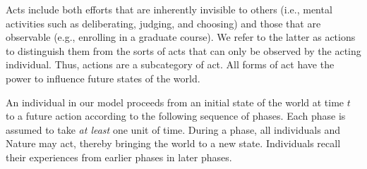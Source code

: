 \documentclass[
11pt,
titlepage,
reqno,
]{article}%
\theoremstyle{definition}
\begin{document}
Acts include both efforts that are inherently invisible to others (i.e., mental activities such as deliberating, judging, and choosing) and those that are observable (e.g., enrolling in a graduate course).
We refer to the latter as actions to distinguish them from the sorts of acts that can only be observed by the acting individual. 
Thus, actions are a subcategory of act.
All forms of act have the power to influence future  states of the world.

An individual in our model proceeds from an initial state of the world at time $t$ to a future action according to the following sequence of phases. Each phase is assumed to take \textit{at least} one unit of time. During a phase, all individuals and Nature may act, thereby bringing the world to a new state. Individuals recall their experiences from earlier phases in later phases.
\end{document}
